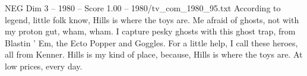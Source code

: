 \begin{textsample}{NEG Dim 3 – 1980 – Score 1.00 – 1980/tv\_com\_1980\_95.txt}  \label{ex:f3_neg_049}
According to legend, little folk know, Hills is where the toys are.
Me afraid of ghosts, not with my proton gut, wham, wham.
I capture pesky ghosts with this ghost trap, from Blastin ' Em, the Ecto Popper and Goggles.
For a little help, I call these heroes, all from Kenner.
Hills is my kind of place, because, Hills is where the toys are.
At low prices, every day.

\end{textsample}
